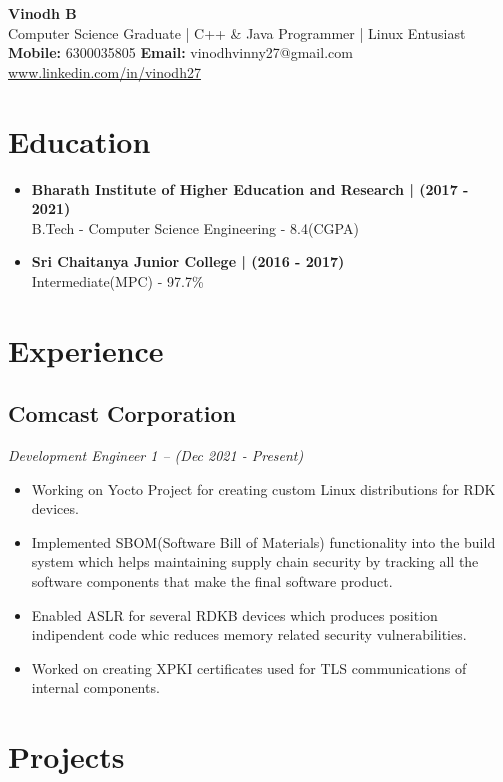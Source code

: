 \documentclass[11pt,a5paper]{article}
\renewcommand{\maketitle}[5]{
	\begin{center}
	\huge{\bfseries{#1}} \\
	\vspace*{0.25em}
	\large{#2} \\
	\vspace*{0.25em}
	\textbf{Mobile:} {#3} \hspace*{0.5em}
	\textbf{Email:} {#4} \hspace*{0.5em}
	\url{#5}
	\end{center}
}
\begin{document}
\maketitle
{Vinodh B}
{Computer Science Graduate | C++ \& Java Programmer | Linux Entusiast}
{6300035805}
{vinodhvinny27@gmail.com}
{www.linkedin.com/in/vinodh27}

\thispagestyle{empty}

\section{Education}
\begin{itemize}[leftmargin=3mm]
	\setlength\itemsep{0em}
\item {
	\textbf{Bharath Institute of Higher Education and Research | (2017 {-} 2021)} \\
	B.Tech {-} Computer Science Engineering {-} 8.4(CGPA)
}
\item {
	\textbf{Sri Chaitanya Junior College | (2016 {-} 2017)} \\
	Intermediate(MPC) {-} 97.7\%
}
\end{itemize}

\section{Experience}
\subsection{Comcast Corporation}
\hspace*{0.25em}\textit{Development Engineer 1 -- (Dec 2021 - Present)}
\begin{itemize}[leftmargin=6mm]
	\setlength\itemsep{0em}
	\item{Working on Yocto Project for creating custom Linux distributions for RDK devices.}
	\item{Implemented SBOM(Software Bill of Materials) functionality into the build system which helps maintaining supply chain security by tracking all the software components that make the final software product.}
	\item{Enabled ASLR for several RDKB devices which produces position indipendent code whic reduces memory related security vulnerabilities.}
	\item{Worked on creating XPKI certificates used for TLS communications of internal components.}
\end{itemize}

\section{Projects}
\end{document}
